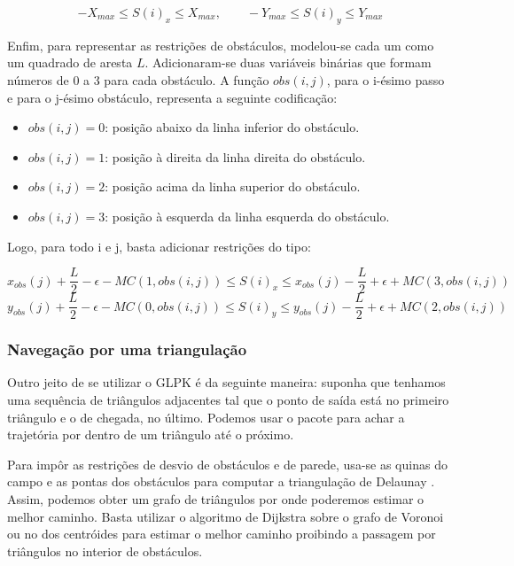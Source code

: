 \documentclass[a4paper,12pt]{article}
\begin{document}
\begin{equation}
	-X_{max} \leqslant S(i)_{x} \leqslant X_{max}, \qquad -Y_{max} \leqslant S(i)_{y} \leqslant Y_{max}
\end{equation}

Enfim, para representar as restrições de obstáculos, modelou-se cada um como um quadrado de aresta $L$. Adicionaram-se duas variáveis binárias que formam números de 0 a 3 para cada obstáculo. A função $obs(i, j)$, para o i-ésimo passo e para o j-ésimo obstáculo, representa a seguinte codificação:

\begin{itemize}
\item $obs(i, j) = 0$: posição abaixo da linha inferior do obstáculo.
\item $obs(i, j) = 1$: posição à direita da linha direita do obstáculo.
\item $obs(i, j) = 2$: posição acima da linha superior do obstáculo.
\item $obs(i, j) = 3$: posição à esquerda da linha esquerda do obstáculo.
\end{itemize}

Logo, para todo i e j, basta adicionar restrições do tipo:

\begin{equation}
	x_{obs}(j) +  \frac{L}{2} - \epsilon - MC(1,obs(i,j)) \leq S(i)_x \leq x_{obs}(j) - \frac{L}{2} + \epsilon + MC(3,obs(i,j))
\end{equation}
\begin{equation}
	y_{obs}(j) +  \frac{L}{2} - \epsilon - MC(0,obs(i,j)) \leq S(i)_y \leq y_{obs}(j) -  \frac{L}{2} + \epsilon  + MC(2,obs(i,j))
\end{equation}

\subsubsection{Navegação por uma triangulação}

Outro jeito de se utilizar o GLPK é da seguinte maneira: suponha que tenhamos uma sequência de triângulos adjacentes tal que o ponto de saída está no primeiro triângulo e o de chegada, no último. Podemos usar o pacote para achar a trajetória por dentro de um triângulo até o próximo.

Para impôr as restrições de desvio de obstáculos e de parede, usa-se as quinas do campo e as pontas dos obstáculos para computar a triangulação de Delaunay \cite{delaunay34}. Assim, podemos obter um grafo de triângulos por onde poderemos estimar o melhor caminho. Basta utilizar o algoritmo de Dijkstra \cite{dijkstra59} sobre o grafo de Voronoi \cite{voronoi08} ou no dos centróides para estimar o melhor caminho proibindo a passagem por triângulos no interior de obstáculos.
\end{document}
